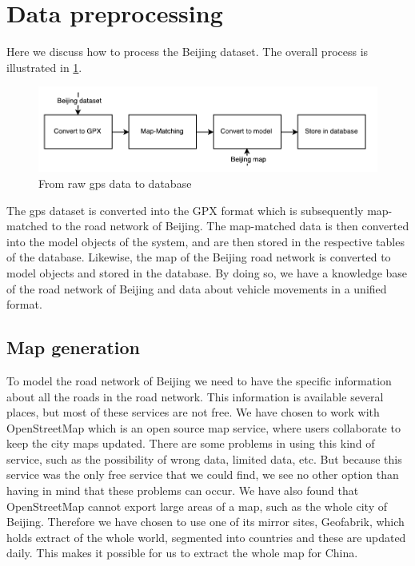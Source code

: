 \section{Data preprocessing}
Here we discuss how to process the Beijing dataset. The overall process is illustrated in \ref{fig:data-processing}.

\begin{figure}[h!]
  \centering
    \includegraphics[width=1\textwidth]{figures/data-processing.pdf}
    \caption{From raw gps data to database}
    \label{fig:data-processing}
\end{figure}

The gps dataset is converted into the GPX format which is subsequently map-matched to the road network of Beijing. The map-matched data is then converted into the model objects of the system, and are then stored in the respective tables of the database. Likewise, the map of the Beijing road network is converted to model objects and stored in the database. By doing so, we have a knowledge base of the road network of Beijing and data about vehicle movements in a unified format. 

\subsection{Map generation}
To model the road network of Beijing we need to have the specific information about all the roads in the road network. This information is available several places, but most of these services are not free. We have chosen to work with OpenStreetMap which is an open source map service, where users collaborate to keep the city maps updated. There are some problems in using this kind of service, such as the possibility of wrong data, limited data, etc. But because this service was the only free service that we could find, we see no other option than having in mind that these problems can occur. We have also found that OpenStreetMap cannot export large areas of a map, such as the whole city of Beijing. Therefore we have chosen to use one of its mirror sites, Geofabrik, which holds extract of the whole world, segmented into countries and these are updated daily. This makes it possible for us to extract the whole map for China.


